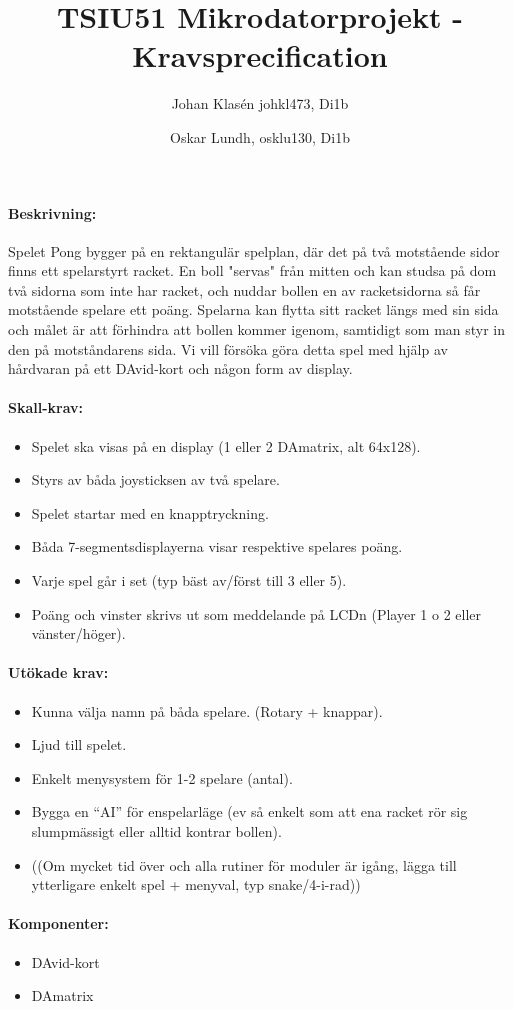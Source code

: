 \documentclass{article}
\title{TSIU51 Mikrodatorprojekt - Kravsprecification}
\author{
	Johan Klasén johkl473, Di1b
	\and
	Oskar Lundh, osklu130, Di1b
	}
\date{}
\begin{document}
\maketitle

\paragraph{Beskrivning:}
Spelet Pong bygger på en rektangulär spelplan, där det på två motstående sidor finns ett spelarstyrt racket. En boll "servas" från mitten och kan studsa på dom två sidorna som inte har racket,
och nuddar bollen en av racketsidorna så får motstående spelare ett poäng. Spelarna kan flytta sitt racket längs med sin sida och målet är att förhindra att bollen kommer igenom, samtidigt som man styr in den på motståndarens sida.
Vi vill försöka göra detta spel med hjälp av hårdvaran på ett DAvid-kort och någon form av display.

\hfill

\paragraph{Skall-krav:}
\begin{itemize}
	\item Spelet ska visas på en display (1 eller 2 DAmatrix, alt 64x128).
	\item Styrs av båda joysticksen av två spelare.
	\item Spelet startar med en knapptryckning.
	\item Båda 7-segmentsdisplayerna visar respektive spelares poäng.
	\item Varje spel går i set (typ bäst av/först till 3 eller 5).
	\item Poäng och vinster skrivs ut som meddelande på LCDn (Player 1 o 2 eller vänster/höger).

\end{itemize}

\paragraph{Utökade krav:}
\begin{itemize}
	\item Kunna välja namn på båda spelare. (Rotary + knappar).
	\item Ljud till spelet.
	\item Enkelt menysystem för 1-2 spelare (antal).
	\item Bygga en “AI” för enspelarläge (ev så enkelt som att ena racket rör sig slumpmässigt eller alltid kontrar bollen).

	\item ((Om mycket tid över och alla rutiner för moduler är igång, lägga till ytterligare enkelt spel + menyval, typ snake/4-i-rad))
\end{itemize}


\paragraph{Komponenter:}
\begin{itemize}
	\item DAvid-kort
	\item DAmatrix
\end{itemize}
\end{document}
